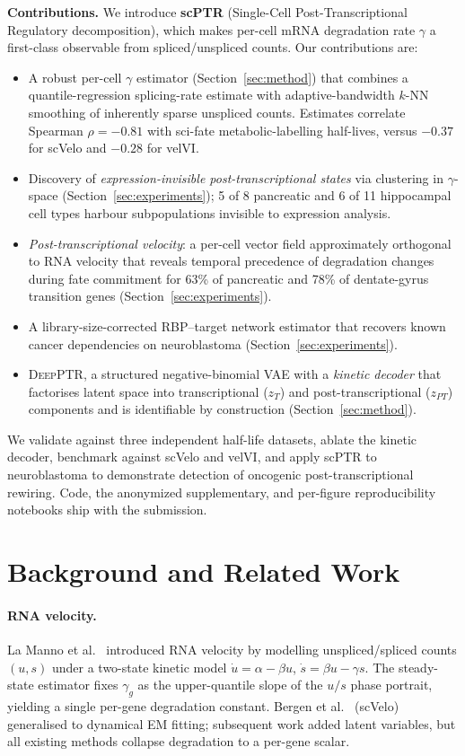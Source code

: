 \documentclass{article}
\begin{document}
\textbf{Contributions.} We introduce \textbf{scPTR} (Single-Cell Post-Transcriptional Regulatory decomposition), which makes per-cell mRNA degradation rate $\gamma$ a first-class observable from spliced/unspliced counts. Our contributions are:
\begin{itemize}
  \item A robust per-cell $\gamma$ estimator (Section~\ref{sec:method}) that combines a quantile-regression splicing-rate estimate with adaptive-bandwidth $k$-NN smoothing of inherently sparse unspliced counts. Estimates correlate Spearman $\rho{=}{-}0.81$ with sci-fate metabolic-labelling half-lives, versus $-0.37$ for scVelo and $-0.28$ for velVI.
  \item Discovery of \textit{expression-invisible post-transcriptional states} via clustering in $\gamma$-space (Section~\ref{sec:experiments}); 5 of 8 pancreatic and 6 of 11 hippocampal cell types harbour subpopulations invisible to expression analysis.
  \item \textit{Post-transcriptional velocity}: a per-cell vector field approximately orthogonal to RNA velocity that reveals temporal precedence of degradation changes during fate commitment for 63\% of pancreatic and 78\% of dentate-gyrus transition genes (Section~\ref{sec:experiments}).
  \item A library-size-corrected RBP--target network estimator that recovers known cancer dependencies on neuroblastoma (Section~\ref{sec:experiments}).
  \item \textsc{DeepPTR}, a structured negative-binomial VAE with a \textit{kinetic decoder} that factorises latent space into transcriptional ($z_T$) and post-transcriptional ($z_{PT}$) components and is identifiable by construction (Section~\ref{sec:method}).
\end{itemize}

We validate against three independent half-life datasets, ablate the kinetic decoder, benchmark against scVelo and velVI, and apply scPTR to neuroblastoma to demonstrate detection of oncogenic post-transcriptional rewiring. Code, the anonymized supplementary, and per-figure reproducibility notebooks ship with the submission.

\section{Background and Related Work}

\paragraph{RNA velocity.} La Manno et al.\ \cite{lamanno2018} introduced RNA velocity by modelling unspliced/spliced counts $(u, s)$ under a two-state kinetic model $\dot{u} = \alpha - \beta u$, $\dot{s} = \beta u - \gamma s$. The steady-state estimator fixes $\gamma_g$ as the upper-quantile slope of the $u/s$ phase portrait, yielding a single per-gene degradation constant. Bergen et al.\ \cite{bergen2020} (scVelo) generalised to dynamical EM fitting; subsequent work \cite{gayoso2024,gao2022} added latent variables, but all existing methods collapse degradation to a per-gene scalar.
\end{document}
